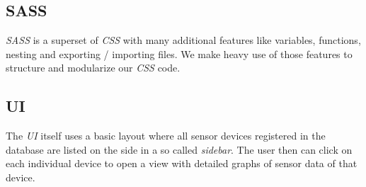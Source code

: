 \subsection{SASS}

\textit{SASS} is a superset of \textit{CSS} with many additional features like variables, functions,
nesting and exporting / importing files. We make heavy use of those features to structure and
modularize our \textit{CSS} code.

\subsection{UI}

The \textit{UI} itself uses a basic layout where all sensor devices registered in the database are
listed on the side in a so called \textit{sidebar}. The user then can click on each individual
device to open a view  with detailed graphs of sensor data of that device.